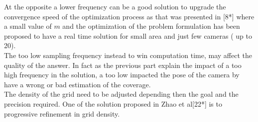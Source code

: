 At the opposite a lower  frequency can be a good solution to upgrade the convergence speed of the optimization process as that was presented in [8*] where a small value of $m$ and the optimization of the problem formulation has been proposed to have a real time solution for small area and just few cameras ( up to  20).\\

The too low sampling frequency instead to win  computation time, may affect the quality of the answer. In fact as the previous part explain the impact of a too high frequency in the solution, a too low impacted the pose of the camera by have a wrong or bad estimation of the coverage.  \\
The density of the grid need to be adjusted depending then the goal and the precision required. One of the solution proposed in Zhao et al[22*] is to progressive refinement in grid density.


